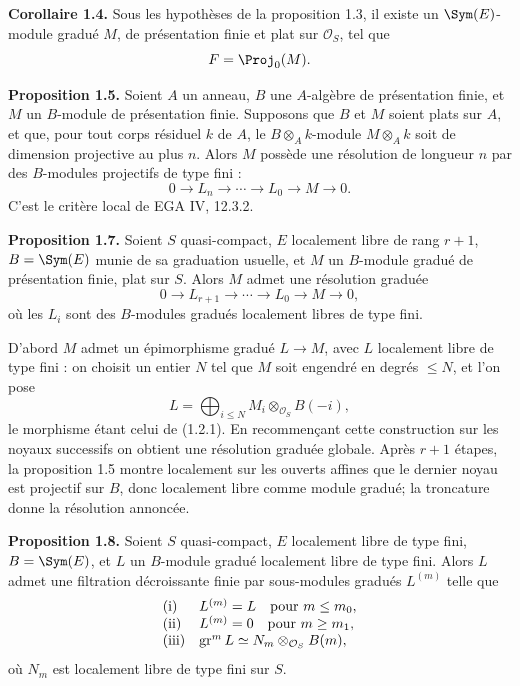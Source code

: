 \documentclass[11pt]{article}
\begin{document}
\textbf{Corollaire 1.4.} Sous les hypothèses de la proposition 1.3, il existe un \(\Sym(E)\)-module gradué \(M\), de présentation finie et plat sur \(\mathcal O_S\), tel que
\[
  F=\Proj_0(M).
\]

\textbf{Proposition 1.5.} Soient \(A\) un anneau, \(B\) une \(A\)-algèbre de présentation finie, et \(M\) un \(B\)-module de présentation finie. Supposons que \(B\) et \(M\) soient plats sur \(A\), et que, pour tout corps résiduel \(k\) de \(A\), le \(B\otimes_A k\)-module \(M\otimes_A k\) soit de dimension projective au plus \(n\). Alors \(M\) possède une résolution de longueur \(n\) par des \(B\)-modules projectifs de type fini :
\[
  0\longrightarrow L_n\longrightarrow\cdots\longrightarrow L_0\longrightarrow M\longrightarrow 0.
\]
C'est le critère local de EGA IV, 12.3.2.

\textbf{Proposition 1.7.} Soient \(S\) quasi-compact, \(E\) localement libre de rang \(r+1\), \(B=\Sym(E)\) munie de sa graduation usuelle, et \(M\) un \(B\)-module gradué de présentation finie, plat sur \(S\). Alors \(M\) admet une résolution graduée
\[
  0\longrightarrow L_{r+1}\longrightarrow\cdots\longrightarrow L_0\longrightarrow M\longrightarrow 0,
\]
où les \(L_i\) sont des \(B\)-modules gradués localement libres de type fini.

D'abord \(M\) admet un épimorphisme gradué \(L\to M\), avec \(L\) localement libre de type fini : on choisit un entier \(N\) tel que \(M\) soit engendré en degrés \(\leq N\), et l'on pose
\[
  L=\bigoplus_{i\leq N}M_i\otimes_{\mathcal O_S}B(-i),
\]
le morphisme étant celui de (1.2.1). En recommençant cette construction sur les noyaux successifs on obtient une résolution graduée globale. Après \(r+1\) étapes, la proposition 1.5 montre localement sur les ouverts affines que le dernier noyau est projectif sur \(B\), donc localement libre comme module gradué; la troncature donne la résolution annoncée.

\textbf{Proposition 1.8.} Soient \(S\) quasi-compact, \(E\) localement libre de type fini, \(B=\Sym(E)\), et \(L\) un \(B\)-module gradué localement libre de type fini. Alors \(L\) admet une filtration décroissante finie par sous-modules gradués \(L^{(m)}\) telle que
\[
\begin{array}{ll}
\text{\rm (i)}& L^{(m)}=L\quad\text{pour }m\leq m_0,\\
\text{\rm (ii)}& L^{(m)}=0\quad\text{pour }m\geq m_1,\\
\text{\rm (iii)}& \operatorname{gr}^mL\simeq N_m\otimes_{\mathcal O_S}B(m),
\end{array}
\]
où \(N_m\) est localement libre de type fini sur \(S\).
\end{document}
